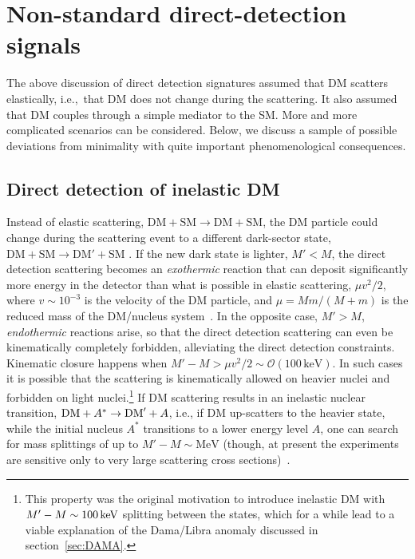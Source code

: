 \section{Non-standard direct-detection signals}
\label{sec:direct:nonstandard}
 
The above discussion of direct detection signatures assumed that DM scatters elastically, 
i.e.,\ that DM does not change during the scattering.
It also assumed that DM couples through a simple mediator to the SM. 
More and more complicated scenarios can be considered.
Below, we discuss a sample of possible deviations from minimality with quite important phenomenological consequences. 


\subsection{Direct detection of inelastic DM}\label{sec:inelasticDM}
\label{sec:inelastic:DM:scattering}
Instead of elastic scattering, $\text{DM}+\text{SM} \to \text{DM}+\text{SM}$, the DM particle could change during the scattering event to a different dark-sector state, $\text{DM}+\text{SM} \to \text{DM}'+\text{SM}$ \cite{inelastic:DM}. 
If the new dark state is lighter, $M'<M$, the direct detection scattering becomes an {\em exothermic} reaction 
that can deposit significantly more energy in the detector than what is possible in elastic scattering, 
 $\mu v^2/2$, where $v\sim 10^{-3}$ is the velocity of the DM particle, and $\mu = Mm/(M+m)$ is the reduced mass of the DM/nucleus system~\cite{exothermic:DM}.  
In the opposite case, $M'>M$, {\em endothermic} reactions arise, so that the direct detection scattering 
can even be kinematically completely forbidden, alleviating the direct detection constraints. 
Kinematic closure happens when $M'- M > \mu v^2/2 \sim {\mathcal O}(100\,\text{keV})$.
In such cases it is possible that the scattering is kinematically allowed on heavier nuclei
and forbidden on light nuclei.\footnote{This property was the original motivation to introduce inelastic DM with 
$ M'-M \sim100\,{\rm keV}$ splitting between the states, 
which for a while lead to a viable explanation of the  {\sc Dama}/{\sc Libra} anomaly discussed in section~\ref{sec:DAMA}.}
 If DM scattering results in an inelastic nuclear transition, ${\rm DM}+A^*\to{\rm DM}'+A$, i.e., if DM up-scatters to the heavier state, while the initial nucleus  $A^*$ transitions to a lower energy level $A$, one can search for mass splittings  of up to $ M'-M \sim \text{MeV}$ 
(though, at present the experiments are sensitive  only to very large scattering cross sections)~\cite{2306.04442}.

